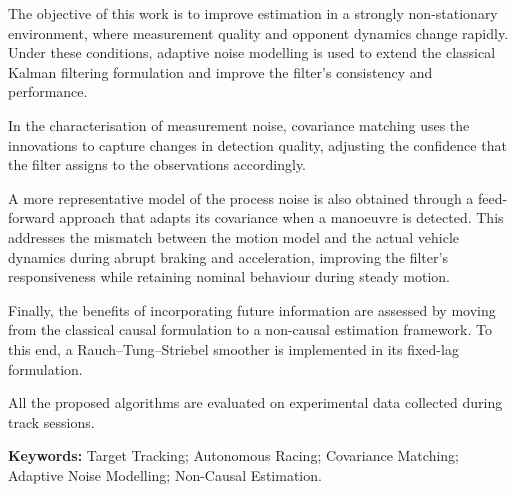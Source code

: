 \documentclass{Configuration_Files/PoliMi3i_thesis}
\begin{document}
The objective of this work is to improve estimation in a strongly non-stationary environment, where measurement quality and opponent dynamics change rapidly. Under these conditions, adaptive noise modelling is used to extend the classical Kalman filtering formulation and improve the filter's consistency and performance.

In the characterisation of measurement noise, covariance matching uses the innovations to capture changes in detection quality, adjusting the confidence that the filter assigns to the observations accordingly.

A more representative model of the process noise is also obtained through a feed-forward approach that adapts its covariance when a manoeuvre is detected. This addresses the mismatch between the motion model and the actual vehicle dynamics during abrupt braking and acceleration, improving the filter's responsiveness while retaining nominal behaviour during steady motion.

Finally, the benefits of incorporating future information are assessed by moving from the classical causal formulation to a non-causal estimation framework. To this end, a Rauch--Tung--Striebel smoother is implemented in its fixed-lag formulation.

All the proposed algorithms are evaluated on experimental data collected during track sessions.

\endgroup
\medskip
\noindent\textbf{Keywords:} Target Tracking; Autonomous Racing; Covariance Matching; Adaptive Noise Modelling; Non-Causal Estimation.

\clearpage
\thispagestyle{empty}
\mbox{}
\clearpage

\let\origcleardoublepage\cleardoublepage\let\cleardoublepage\clearpage
\makeatletter\@openrightfalse\makeatother
\end{document}
